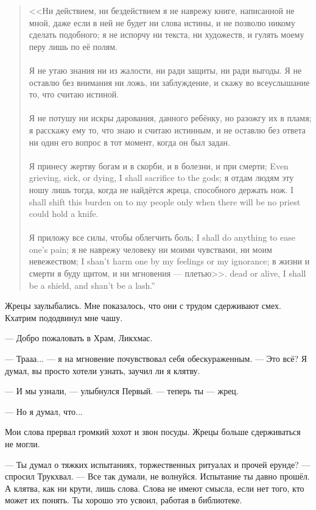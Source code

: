 \begin{quote}
<<Ни действием, ни бездействием я не наврежу книге, написанной не мной, даже если в ней не будет ни слова истины, и не позволю никому сделать подобного;
я не испорчу ни текста, ни художеств, и гулять моему перу лишь по её полям.\\~\\
Я не утаю знания ни из жалости, ни ради защиты, ни ради выгоды.
Я не оставлю без внимания ни ложь, ни заблуждение, и скажу во всеуслышание то, что считаю истиной.\\~\\
Я не потушу ни искры дарования, данного ребёнку, но разожгу их в пламя;
я расскажу ему то, что знаю и считаю истинным, и не оставлю без ответа ни один его вопрос в тот момент, когда он был задан.\\~\\
{Я принесу жертву богам и в скорби, и в болезни, и при смерти;}
{Even grieving, sick, or dying, I shall sacrifice to the gods;}
{я отдам людям эту ношу лишь тогда, когда не найдётся жреца, способного держать нож.}
{I shall shift this burden on to my people only when there will be no priest could hold a knife.}\\~\\
{Я приложу все силы, чтобы облегчить боль;}
{I shall do anything to ease one's pain;}
{я не наврежу человеку ни моими чувствами, ни моим невежеством;}
{I shan't harm one by my feelings or my ignorance;}
{в жизни и смерти я буду щитом, и ни мгновения --- плетью>>.}
{dead or alive, I shall be a shield, and shan't be a lash.''}
\end{quote}

Жрецы заулыбались.
Мне показалось, что они с трудом сдерживают смех.
Кхатрим пододвинул мне чашу.

--- Добро пожаловать в Храм, Ликхмас.

--- Трааа... --- я на мгновение почувствовал себя обескураженным.
--- Это всё?
Я думал, вы просто хотели узнать, заучил ли я клятву.

--- И мы узнали, --- улыбнулся Первый.
--- теперь ты --- жрец.

--- Но я думал, что...

Мои слова прервал громкий хохот и звон посуды.
Жрецы больше сдерживаться не могли.

--- Ты думал о тяжких испытаниях, торжественных ритуалах и прочей ерунде? --- спросил Трукхвал.
--- Все так думали, не волнуйся.
Испытание ты давно прошёл.
А клятва, как ни крути, лишь слова.
Слова не имеют смысла, если нет того, кто может их понять.
Ты хорошо это усвоил, работая в библиотеке.

